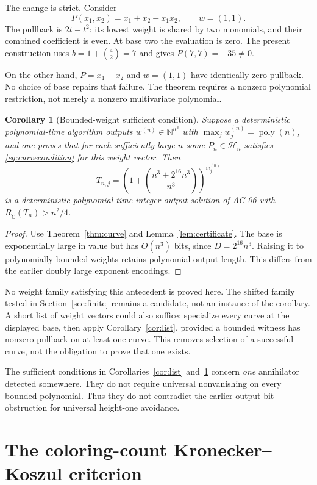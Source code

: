 \documentclass[11pt]{article}
\newtheorem{corollary}[theorem]{Corollary}
\theoremstyle{definition}
\theoremstyle{remark}
\newcommand{\C}{\mathbb C}
\newcommand{\N}{\mathbb N}
\newcommand{\BR}{\underline R_{\C}}
\newcommand{\poly}{\operatorname{poly}}
\newcommand{\Witness}{\mathcal H}
\begin{document}
The change is strict. Consider
\[
 P(x_1,x_2)=x_1+x_2-x_1x_2,\qquad w=(1,1).
\]
The pullback is $2t-t^2$: its lowest weight is shared by two monomials, and their combined coefficient is even. At base two the evaluation is zero. The present construction uses $b=1+\binom{4}{2}=7$ and gives $P(7,7)=-35\ne0$.

On the other hand, $P=x_1-x_2$ and $w=(1,1)$ have identically zero pullback. No choice of base repairs that failure. The theorem requires a nonzero polynomial restriction, not merely a nonzero multivariate polynomial.

\begin{corollary}[Bounded-weight sufficient condition]\label{cor:weights}
Suppose a deterministic polynomial-time algorithm outputs $w^{(n)}\in\N^{n^3}$ with $\max_jw_j^{(n)}=\poly(n)$, and one proves that for each sufficiently large $n$ some $P_n\in\Witness_n$ satisfies \eqref{eq:curvecondition} for this weight vector. Then
\[
 T_{n,j}=\left(1+\binom{n^3+2^{16}n^3}{n^3}\right)^{w_j^{(n)}}
\]
is a deterministic polynomial-time integer-output solution of AC-06 with $\BR(T_n)>n^2/4$.
\end{corollary}
\begin{proof}
Use Theorem~\ref{thm:curve} and Lemma~\ref{lem:certificate}. The base is exponentially large in value but has $O(n^3)$ bits, since $D=2^{16}n^3$. Raising it to polynomially bounded weights retains polynomial output length. This differs from the earlier doubly large exponent encodings.
\end{proof}

No weight family satisfying this antecedent is proved here. The shifted family tested in Section~\ref{sec:finite} remains a candidate, not an instance of the corollary. A short list of weight vectors could also suffice: specialize every curve at the displayed base, then apply Corollary~\ref{cor:list}, provided a bounded witness has nonzero pullback on at least one curve. This removes selection of a successful curve, not the obligation to prove that one exists.

The sufficient conditions in Corollaries~\ref{cor:list} and~\ref{cor:weights} concern \emph{one} annihilator detected somewhere. They do not require universal nonvanishing on every bounded polynomial. Thus they do not contradict the earlier output-bit obstruction for universal height-one avoidance.

\section{The coloring-count Kronecker--Koszul criterion}\label{sec:kk}
\end{document}
